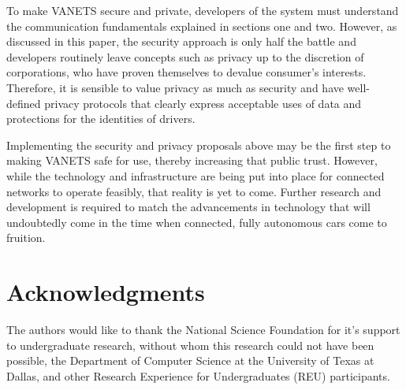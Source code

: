 \documentclass[conference,compsoc]{IEEEtran}
\begin{document}
To make VANETS secure and private, developers of the system must understand the communication fundamentals explained in sections one and two. However, as discussed in this paper, the security approach is only half the battle and developers routinely leave concepts such as privacy up to the discretion of corporations, who have proven themselves to devalue consumer’s interests. Therefore, it is sensible to value privacy as much as security and have well-defined privacy protocols that clearly express acceptable uses of data and protections for the identities of drivers.

Implementing the security and privacy proposals above may be the first step to making VANETS safe for use, thereby increasing that public trust. However, while the technology and infrastructure are being put into place for connected networks to operate feasibly, that reality is yet to come. Further research and development is required to match the advancements in technology that will undoubtedly come in the time when connected, fully autonomous cars come to fruition.


\ifCLASSOPTIONcompsoc
\section*{Acknowledgments}

The authors would like to thank the National Science Foundation for it's support to undergraduate research, without whom this research could not have been possible, the Department of Computer Science at the University of Texas at Dallas, and other Research Experience for Undergraduates (REU) participants.  

\newpage

\end{document}
